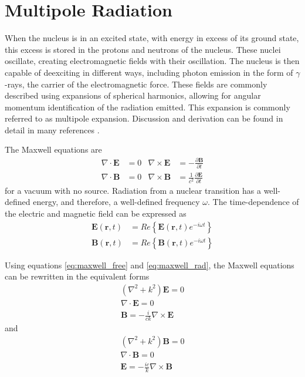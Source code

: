 \section{Multipole Radiation}
\label{sec:multipole}
When the nucleus is in an excited state, with energy in excess of its ground state, this excess is stored in the protons and neutrons of the nucleus. These nuclei oscillate, creating electromagnetic fields with their oscillation. The nucleus is then capable of deexciting in different ways, including photon emission in the form of $\gamma$-rays, the carrier of the electromagnetic force. These fields are commonly described using expansions of spherical harmonics, allowing for angular momentum identification of the radiation emitted. This expansion is commonly referred to as multipole expansion. Discussion and derivation can be found in detail in many references \citep{blatt79:_emradiation, jackson99:_emradiation, zangwill13:_emradiation}.

The Maxwell equations are
\begin{subequations}
\label{eq:maxwell_free}
\begin{align}
    \nabla \cdot \textbf{E} & = 0 &   \nabla \times \textbf{E} & = -\frac{\partial \textbf{B}}{\partial t} \\
     \nabla \cdot \textbf{B} & = 0 &  \nabla \times \textbf{B} & = \frac{1}{c^2}\frac{\partial \textbf{E}}{\partial t}
\end{align}
\end{subequations}
for a vacuum with no source. Radiation from a nuclear transition has a well-defined energy, and therefore, a well-defined frequency $\omega$. The time-dependence of the electric and magnetic field can be expressed as
\begin{subequations}
\label{eq:maxwell_rad}
\begin{align}
    \textbf{E}(\textbf{r},t) & = Re\left\{\textbf{E}(\textbf{r},t)e^{-i\omega t}\right\} \\
    \textbf{B}(\textbf{r},t) & = Re\left\{\textbf{B}(\textbf{r},t)e^{-i\omega t}\right\}
\end{align}
\end{subequations}
 
Using equations \ref{eq:maxwell_free} and \ref{eq:maxwell_rad}, the Maxwell equations can be rewritten in the equivalent forms
\begin{subequations}
\label{eq:maxwell_rw1}
\begin{gather}
    \left(\nabla^2+k^2\right)\textbf{E} = 0 \\
    \nabla \cdot \textbf{E} = 0 \\
    \textbf{B}=-\frac{i}{ck} \nabla \times \textbf{E}
\end{gather}
\end{subequations}
and
\begin{subequations}
\label{eq:maxwell_rw2}
\begin{gather}
    \left(\nabla^2+k^2\right)\textbf{B} = 0 \\
    \nabla \cdot \textbf{B} = 0 \\
    \textbf{E}=-\frac{ic}{k} \nabla \times \textbf{B}
\end{gather}
\end{subequations}

